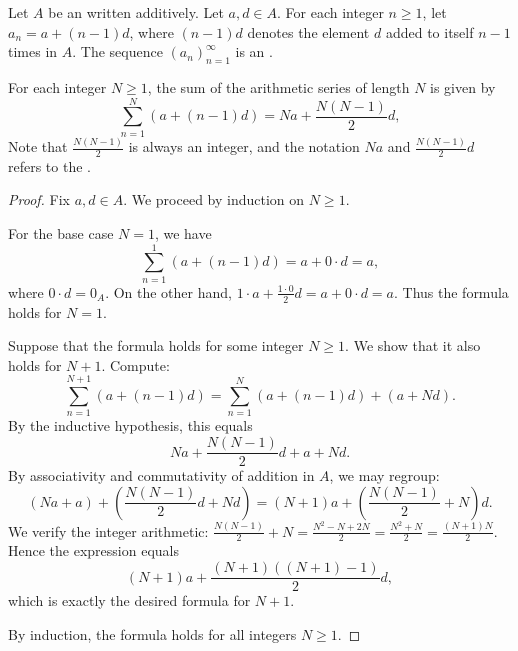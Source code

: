 \begin{proposition} \label{proposition:sum_formula_for_a_finite_arithmetic_series_in_an_abelian_group}
    Let $A$ be an  written additively. Let $a, d \in A$. For each integer $n \geq 1$, let $a_n = a + (n-1)d$, where $(n-1)d$ denotes the element $d$ added to itself $n-1$ times in $A$. The sequence $(a_n)_{n=1}^\infty$ is an .

    For each integer $N \geq 1$, the sum of the arithmetic series of length $N$ is given by
    $$\sum_{n=1}^N (a + (n-1)d) = Na + \frac{N(N-1)}{2}d,$$
    Note that $\frac{N(N-1)}{2}$ is always an integer, and the notation $Na$ and $\frac{N(N-1)}{2}d$ refers to the .
\end{proposition}
\begin{proof}
    Fix $a, d \in A$. We proceed by induction on $N \geq 1$.

    For the base case $N = 1$, we have
    $$\sum_{n=1}^1 (a + (n-1)d) = a + 0 \cdot d = a,$$
    where $0 \cdot d = 0_A$. On the other hand, $1 \cdot a + \frac{1 \cdot 0}{2} d = a + 0 \cdot d = a$. Thus the formula holds for $N = 1$.

    Suppose that the formula holds for some integer $N \geq 1$. We show that it also holds for $N+1$. Compute:
    $$\sum_{n=1}^{N+1} (a + (n-1)d) = \sum_{n=1}^N (a + (n-1)d) + (a + Nd).$$
    By the inductive hypothesis, this equals
    $$Na + \frac{N(N-1)}{2}d + a + Nd.$$
    By associativity and commutativity of addition in $A$, we may regroup:
    $$(Na + a) + \left(\frac{N(N-1)}{2}d + Nd\right) = (N+1)a + \left(\frac{N(N-1)}{2} + N\right)d.$$
    We verify the integer arithmetic: $\frac{N(N-1)}{2} + N = \frac{N^2 - N + 2N}{2} = \frac{N^2 + N}{2} = \frac{(N+1)N}{2}$. Hence the expression equals
    $$(N+1)a + \frac{(N+1)((N+1)-1)}{2}d,$$
    which is exactly the desired formula for $N+1$.

    By induction, the formula holds for all integers $N \geq 1$.
\end{proof}
